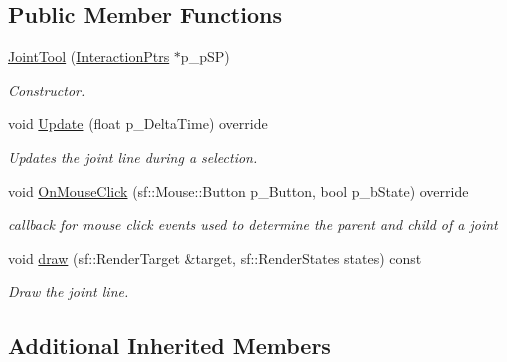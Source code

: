 \subsection*{Public Member Functions}
\begin{DoxyCompactItemize}
\item 
\mbox{\label{class_joint_tool_a023c782f823a670bc230a437eff95a6d}} 
\hyperlink{class_joint_tool_a023c782f823a670bc230a437eff95a6d}{Joint\+Tool} (\hyperlink{struct_interaction_ptrs}{Interaction\+Ptrs} $\ast$p\+\_\+p\+SP)
\begin{DoxyCompactList}\small\item\em Constructor. \end{DoxyCompactList}\item 
\mbox{\label{class_joint_tool_ac00895518431be66662033b126ae6427}} 
void \hyperlink{class_joint_tool_ac00895518431be66662033b126ae6427}{Update} (float p\+\_\+\+Delta\+Time) override
\begin{DoxyCompactList}\small\item\em Updates the joint line during a selection. \end{DoxyCompactList}\item 
\mbox{\label{class_joint_tool_a1d67646dea85f21555baa3dffc884876}} 
void \hyperlink{class_joint_tool_a1d67646dea85f21555baa3dffc884876}{On\+Mouse\+Click} (sf\+::\+Mouse\+::\+Button p\+\_\+\+Button, bool p\+\_\+b\+State) override
\begin{DoxyCompactList}\small\item\em callback for mouse click events used to determine the parent and child of a joint \end{DoxyCompactList}\item 
\mbox{\label{class_joint_tool_afc73a29a1c72a5e58da7d8f2cc6d43b4}} 
void \hyperlink{class_joint_tool_afc73a29a1c72a5e58da7d8f2cc6d43b4}{draw} (sf\+::\+Render\+Target \&target, sf\+::\+Render\+States states) const
\begin{DoxyCompactList}\small\item\em Draw the joint line. \end{DoxyCompactList}\end{DoxyCompactItemize}
\subsection*{Additional Inherited Members}


